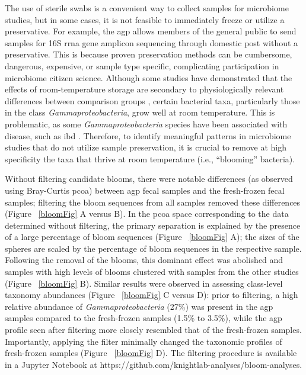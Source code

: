 The use of sterile swabs is a convenient way to collect samples for microbiome studies,
but in some cases, it is not feasible to immediately freeze or utilize a preservative.
For example, the \gls{agp} allows members of the general public to send samples for 16S
\gls{rrna} gene amplicon sequencing through domestic post without a preservative.
This is because proven preservation methods can be cumbersome, dangerous, expensive,
or sample type specific, complicating participation in microbiome citizen science.
Although some studies have demonstrated that the effects of room-temperature storage
are secondary to physiologically relevant differences between comparison groups
\cite{Song2016, Sinha2016, Lauber2010}, certain bacterial taxa,
particularly those in the class \emph{Gammaproteobacteria}, grow well at room temperature.
This is problematic, as some \emph{Gammaproteobacteria} species have been associated
with disease, such as \gls{ibd} \cite{Gevers2014}. Therefore, to identify meaningful
patterns in microbiome studies that do not utilize sample preservation, it is crucial
to remove at high specificity the taxa that thrive at room temperature (i.e., “blooming” bacteria).

Without filtering candidate blooms, there were notable differences (as observed using Bray-Curtis
\gls{pcoa}) between \gls{agp} fecal samples and the fresh-frozen fecal samples;
filtering the bloom sequences from all samples removed these differences (Figure ~\ref{bloomFig} A versus B).
In the \gls{pcoa} space corresponding to the data determined without filtering, the primary
separation is explained by the presence of a large percentage of bloom sequences (Figure ~\ref{bloomFig} A);
the sizes of the spheres are scaled by the percentage of bloom sequences in the respective sample.
Following the removal of the blooms, this dominant effect was abolished and samples with high levels of
blooms clustered with samples from the other studies (Figure ~\ref{bloomFig} B). Similar results were observed
in assessing class-level taxonomy abundances (Figure ~\ref{bloomFig} C versus D): prior to filtering,
a high relative abundance of \emph{Gammaproteobacteria} (27\%) was present in the \gls{agp} samples
compared to the fresh-frozen samples (1.5\% to 3.5\%), while the \gls{agp} profile seen after filtering
more closely resembled that of the fresh-frozen samples. Importantly, applying the filter minimally
changed the taxonomic profiles of fresh-frozen samples (Figure ~\ref{bloomFig} D). The filtering
procedure is available in a Jupyter Notebook \cite{Perez2007} at https://github.com/knightlab-analyses/bloom-analyses.

